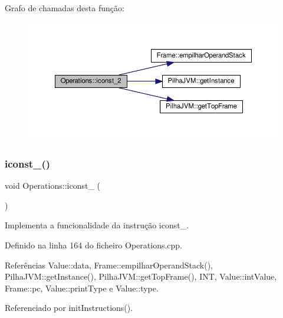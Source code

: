 Grafo de chamadas desta função\+:\nopagebreak
\begin{figure}[H]
\begin{center}
\leavevmode
\includegraphics[width=350pt]{classOperations_af1a4f99f0d99da0a7db7fc926932a3c8_cgraph}
\end{center}
\end{figure}
\mbox{\label{classOperations_ab8466864c000152e75172b623704f610}} 
\subsubsection{\texorpdfstring{iconst\+\_()}{iconst\_3()}}
{\footnotesize\ttfamily void Operations\+::iconst\+\_ (\begin{DoxyParamCaption}{ }\end{DoxyParamCaption})\hspace{0.3cm}{\ttfamily [private]}}



Implementa a funcionalidade da instrução iconst\+\_. 



Definido na linha 164 do ficheiro Operations.\+cpp.



Referências Value\+::data, Frame\+::empilhar\+Operand\+Stack(), Pilha\+J\+V\+M\+::get\+Instance(), Pilha\+J\+V\+M\+::get\+Top\+Frame(), I\+NT, Value\+::int\+Value, Frame\+::pc, Value\+::print\+Type e Value\+::type.



Referenciado por init\+Instructions().

